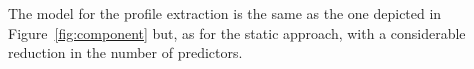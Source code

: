 The model for the profile extraction is the same as the one depicted in Figure~\ref{fig:component} but, as for the static approach, with a considerable reduction in the number of predictors. 

%
%
%




